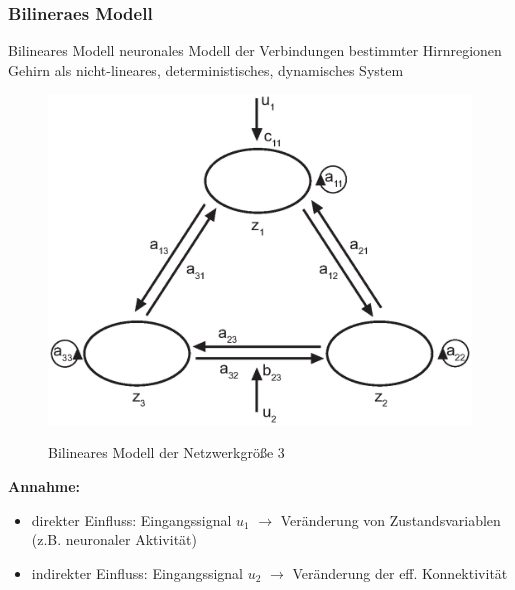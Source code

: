 \documentclass{beamer}
\begin{document}
	\subsubsection{Bilineraes Modell}
	\begin{frame}{Bilineares Modell}
		neuronales Modell der Verbindungen bestimmter Hirnregionen
		Gehirn als nicht-lineares, deterministisches, dynamisches System 
		\begin{figure}[H]
			\begin{center} \label{fig: bilinearesModell}
				\includegraphics[scale=0.4]{bilinearesModell.eps}
				\caption{Bilineares Modell der Netzwerkgröße 3}
			\end{center}
		\end{figure}		
			
		\textbf{Annahme:}
		\begin{itemize}
			\item direkter Einfluss: Eingangssignal $ u_1 $ $ \rightarrow $ Veränderung von Zustandsvariablen (z.B. neuronaler Aktivität)
			\item indirekter Einfluss: Eingangssignal $ u_2 $ $ \rightarrow $ Veränderung der eff. Konnektivität
		\end{itemize}
			
	\end{frame}
\end{document}
